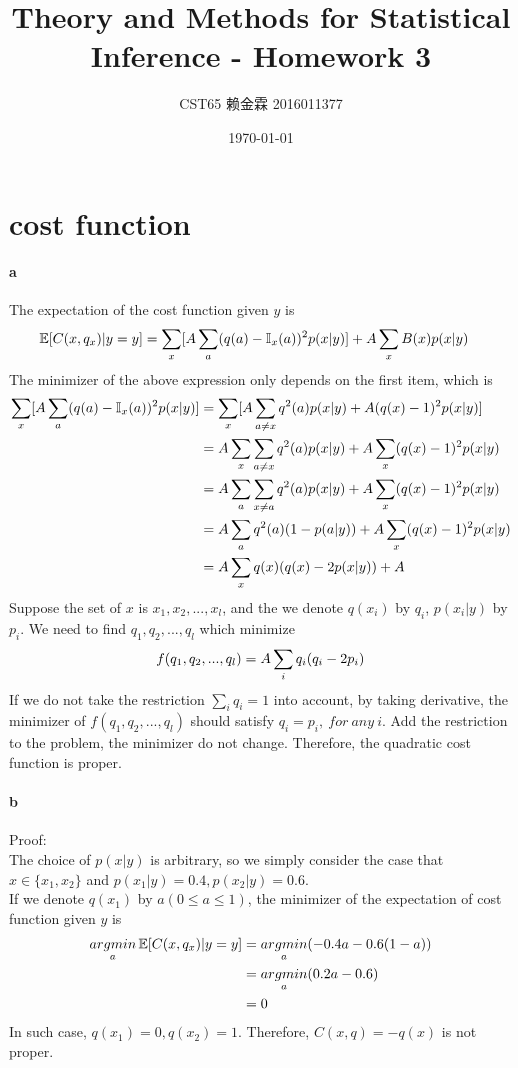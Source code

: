 \documentclass{article}
\title{Theory and Methods for Statistical Inference - Homework 3}
\author{CST65 赖金霖 2016011377}
\date{\today}
\begin{document}
\maketitle    
\section{cost function}
\paragraph{a}

The expectation of the cost function given $y$ is
\begin{align}
	\mathbb{E}[C(x,q_x)|y=y]&=\sum_{x}[A\sum_a(q(a)-\mathbb{I}_x(a))^2p(x|y)]+A\sum_x B(x)p(x|y)\notag
\end{align}
The minimizer of the above expression only depends on the first item, which is
\begin{align}
	\sum_{x}[A\sum_a(q(a)-\mathbb{I}_x(a))^2p(x|y)]&=\sum_{x}[A\sum_{a\neq x}q^2(a)p(x|y)+A(q(x)-1)^2p(x|y)]\notag\\
	&=A\sum_{x}\sum_{a\neq x}q^2(a)p(x|y)+A\sum_{x}(q(x)-1)^2p(x|y)\notag\\
	&=A\sum_{a}\sum_{x\neq a}q^2(a)p(x|y)+A\sum_{x}(q(x)-1)^2p(x|y)\notag\\
	&=A\sum_{a}q^2(a)(1-p(a|y))+A\sum_{x}(q(x)-1)^2p(x|y)\notag\\
	&=A\sum_{x}q(x)(q(x)-2p(x|y))+A\notag
\end{align}
Suppose the set of $x$ is ${x_1,x_2,...,x_l}$, and the we denote $q(x_i)$ by $q_i$, $p(x_i|y)$ by $p_i$. We need to find $q_1,q_2,...,q_l$ which minimize
\begin{align}
	f(q_1,q_2,...,q_l)=A\sum_{i}q_i(q_i-2p_i)\notag
\end{align}
If we do not take the restriction $\sum_{i}q_i=1$ into account, by taking derivative, the minimizer of $f(q_1,q_2,...,q_l)$ should satisfy $q_i=p_i,\ for\ any\ i$. Add the restriction to the problem, the minimizer do not change.
Therefore, the quadratic cost function is proper.
\paragraph{b}

Proof:\\
The choice of $p(x|y)$ is arbitrary, so we simply consider the case that $x\in \{x_1,x_2\}$ and $p(x_1|y)=0.4, p(x_2|y)=0.6$.\\
If we denote $q(x_1)$ by $a(0\le a \le 1)$, the minimizer of the expectation of cost function given $y$ is
\begin{align}
	\mathop{argmin}_{a}\mathbb{E}[C(x,q_x)|y=y]&=\mathop{argmin}_{a}(-0.4a-0.6(1-a))\notag\\
	&=\mathop{argmin}_{a}(0.2a-0.6)\notag\\
	&=0\notag
\end{align}
In such case, $q(x_1)=0, q(x_2)=1$. Therefore, $C(x,q)=-q(x)$ is not proper.
\end{document}

